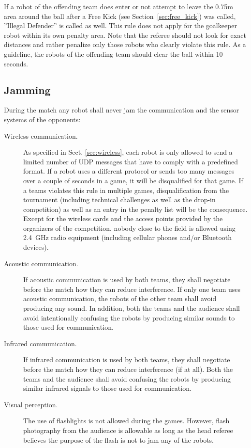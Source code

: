 \documentclass[12pt]{article}
\newcommand{\FreeKickRadius}{0.75m\xspace}
\begin{document}
If a robot of the offending team does enter or not attempt to leave the \FreeKickRadius area around the ball after a Free Kick (see Section~\ref{sec:free_kick}) was called, ''Illegal Defender'' is called as well. This rule does not apply for the goalkeeper robot within its own penalty area. Note that the referee should not look for exact distances and rather penalize only those robots who clearly violate this rule. As a guideline, the robots of the offending team should clear the ball within 10 seconds.

\subsection{Jamming}
\label{sec:jamming}
During the match any robot shall never jam the communication and the sensor systems of the opponents:

\begin{description}

\item[Wireless communication.] As specified in Sect. \ref{sec:wireless}, each robot is only allowed to send a limited number of UDP messages that have to comply with a predefined format. If a robot uses a different protocol or sends too many messages over a couple of seconds in a game, it will be disqualified for that game. If a teams violates this rule in multiple games, disqualification from the tournament (including technical challenges as well as the drop-in competition) as well as an entry in the penalty list will be the consequence. Except for the wireless cards and the access points provided by the organizers of the competition, nobody close to the field is allowed using 2.4~GHz radio equipment (including cellular phones and/or Bluetooth devices).

\item[Acoustic communication.] If acoustic communication is used by both teams, they shall negotiate before the match how they can reduce interference. If only one team uses acoustic communication, the robots of the other team shall avoid producing any sound. In addition, both the teams and the audience shall avoid intentionally confusing the robots by producing similar sounds to those used for communication.

\item[Infrared communication.] If infrared communication is used by both teams, they shall negotiate before the match how they can reduce interference (if at all). Both the teams and the audience shall avoid confusing the robots by producing similar infrared signals to those used for communication.

\item[Visual perception.] The use of flashlights is not allowed during the games.  However, flash photography from the audience is allowable as long as the head referee believes the purpose of the flash is not to jam any of the robots.

\end{description}
\end{document}
